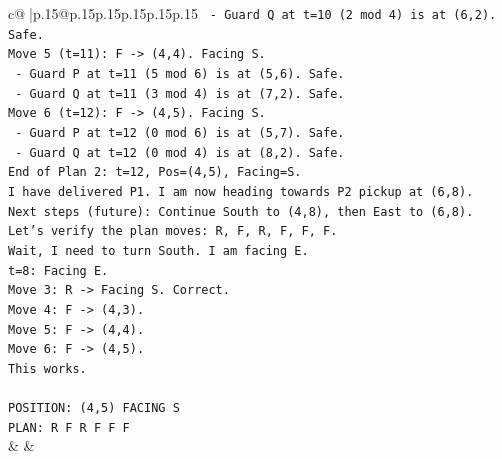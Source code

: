 \documentclass{article}
\begin{document}
{\begin{supertabular}{c@{$\;$}|p{.15\linewidth}@{}p{.15\linewidth}p{.15\linewidth}p{.15\linewidth}p{.15\linewidth}p{.15\linewidth}}
{{{\texttt{  {-} Guard Q at t=10 (2 mod 4) is at (6,2). Safe.} \\
\texttt{Move 5 (t=11): F {-}> (4,4). Facing S.} \\
\texttt{  {-} Guard P at t=11 (5 mod 6) is at (5,6). Safe.} \\
\texttt{  {-} Guard Q at t=11 (3 mod 4) is at (7,2). Safe.} \\
\texttt{Move 6 (t=12): F {-}> (4,5). Facing S.} \\
\texttt{  {-} Guard P at t=12 (0 mod 6) is at (5,7). Safe.} \\
\texttt{  {-} Guard Q at t=12 (0 mod 4) is at (8,2). Safe.} \\
\texttt{End of Plan 2: t=12, Pos=(4,5), Facing=S.} \\
\texttt{I have delivered P1. I am now heading towards P2 pickup at (6,8).} \\
\texttt{Next steps (future): Continue South to (4,8), then East to (6,8).} \\
\texttt{Let's verify the plan moves: R, F, R, F, F, F.} \\
\texttt{Wait, I need to turn South. I am facing E.} \\
\texttt{t=8: Facing E.} \\
\texttt{Move 3: R {-}> Facing S. Correct.} \\
\texttt{Move 4: F {-}> (4,3).} \\
\texttt{Move 5: F {-}> (4,4).} \\
\texttt{Move 6: F {-}> (4,5).} \\
\texttt{This works.} \\
\\ 
\texttt{POSITION: (4,5) FACING S} \\
\texttt{PLAN: R F R F F F} \\
            }
        }
    }
    & & \\ \\


\end{supertabular}}
\end{document}
